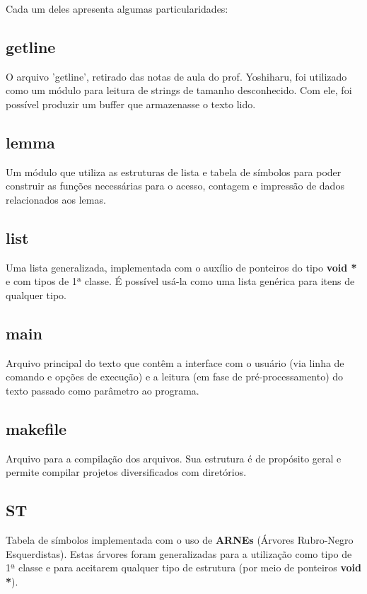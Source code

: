 \documentclass[a4paper,12pt]{article}
\begin{document}
    Cada um deles apresenta algumas particularidades:
    
    \subsection{getline} %
        O arquivo 'getline', retirado das notas de aula do prof.
        Yoshiharu, foi utilizado como um módulo para leitura de strings
        de tamanho desconhecido. Com ele, foi possível produzir um
        buffer que armazenasse o texto lido.

    \subsection{lemma} %
        Um módulo que utiliza as estruturas de lista e tabela de
        símbolos para poder construir as funções necessárias para o
        acesso, contagem e impressão de dados relacionados aos lemas.

    \subsection{list} %
        Uma lista generalizada, implementada com o auxílio de ponteiros
        do tipo \textbf{void *} e com tipos de 1ª classe. É possível
        usá-la como uma lista genérica para itens de qualquer tipo.

    \subsection{main} %
        Arquivo principal do texto que contêm a interface com o usuário
        (via linha de comando e opções de execução) e a leitura (em fase
        de pré-processamento) do texto passado como parâmetro ao
        programa.

    \subsection{makefile} %
        Arquivo para a compilação dos arquivos. Sua estrutura é de
        propósito geral e permite compilar projetos diversificados com
        diretórios.
        
    \subsection{ST} %
        Tabela de símbolos implementada com o uso de \textbf{ARNEs}
        (Árvores Rubro-Negro Esquerdistas). Estas árvores foram
        generalizadas para a utilização como tipo de 1ª classe e para
        aceitarem qualquer tipo de estrutura (por meio de ponteiros 
        \textbf{void *}).
\end{document}
